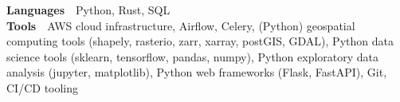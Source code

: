 

\begin{cvparagraph}

\textbf{Languages}~\textemdash~Python, Rust, SQL\\
\textbf{Tools}~\textemdash~AWS cloud infrastructure, Airflow, Celery, (Python) geospatial computing tools (shapely, rasterio, zarr, xarray, postGIS, GDAL), Python data science tools (sklearn, tensorflow, pandas, numpy), Python exploratory data analysis (jupyter, matplotlib), Python web frameworks (Flask, FastAPI), Git, CI/CD tooling
\end{cvparagraph}